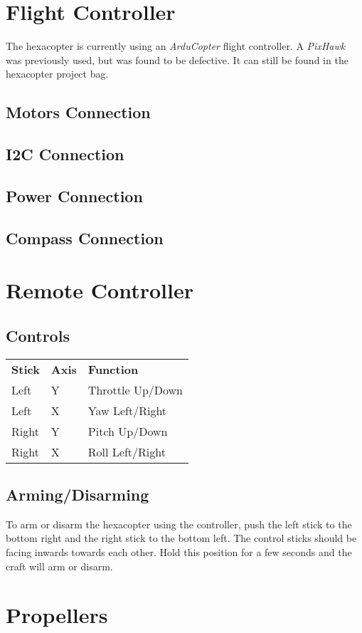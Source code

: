 \documentclass{style}
\begin{document}
\section{Flight Controller}
The hexacopter is currently using an \textit{ArduCopter} flight controller.
A \textit{PixHawk} was previously used, but was found to be defective.
It can still be found in the hexacopter project bag.
\subsection{Motors Connection}
\subsection{I2C Connection}
\subsection{Power Connection}
\subsection{Compass Connection}
\section{Remote Controller}
\subsection{Controls}
\begin{tabular}{ l l l }
  \textbf{Stick} & \textbf{Axis} & \textbf{Function} \\
  Left & Y & Throttle Up/Down \\
  Left & X & Yaw Left/Right \\
  Right & Y & Pitch Up/Down \\
  Right & X & Roll Left/Right
\end{tabular}
\subsection{Arming/Disarming}
To arm or disarm the hexacopter using the controller, push the left stick to the bottom right and the right stick to the bottom left.  The control sticks should be facing inwards towards each other.  Hold this position for a few seconds and the craft will arm or disarm.
\section{Propellers}
\end{document}
